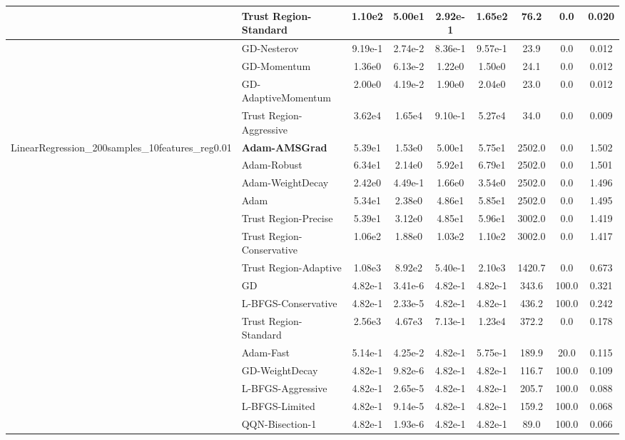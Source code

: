 \documentclass{article}
\begin{document}
\begin{longtable}{|l|l|c|c|c|c|c|c|c|}
\hline
 & Trust Region-Standard & 1.10e2 & 5.00e1 & 2.92e-1 & 1.65e2 & 76.2 & 0.0 & 0.020 \\
\hline
 & GD-Nesterov & 9.19e-1 & 2.74e-2 & 8.36e-1 & 9.57e-1 & 23.9 & 0.0 & 0.012 \\
\hline
 & GD-Momentum & 1.36e0 & 6.13e-2 & 1.22e0 & 1.50e0 & 24.1 & 0.0 & 0.012 \\
\hline
 & GD-AdaptiveMomentum & 2.00e0 & 4.19e-2 & 1.90e0 & 2.04e0 & 23.0 & 0.0 & 0.012 \\
\hline
 & Trust Region-Aggressive & 3.62e4 & 1.65e4 & 9.10e-1 & 5.27e4 & 34.0 & 0.0 & 0.009 \\
LinearRegression\_200samples\_10features\_reg0.01 & \textbf{Adam-AMSGrad} & 5.39e1 & 1.53e0 & 5.00e1 & 5.75e1 & 2502.0 & 0.0 & 1.502 \\
\hline
 & Adam-Robust & 6.34e1 & 2.14e0 & 5.92e1 & 6.79e1 & 2502.0 & 0.0 & 1.501 \\
\hline
 & Adam-WeightDecay & 2.42e0 & 4.49e-1 & 1.66e0 & 3.54e0 & 2502.0 & 0.0 & 1.496 \\
\hline
 & Adam & 5.34e1 & 2.38e0 & 4.86e1 & 5.85e1 & 2502.0 & 0.0 & 1.495 \\
\hline
 & Trust Region-Precise & 5.39e1 & 3.12e0 & 4.85e1 & 5.96e1 & 3002.0 & 0.0 & 1.419 \\
\hline
 & Trust Region-Conservative & 1.06e2 & 1.88e0 & 1.03e2 & 1.10e2 & 3002.0 & 0.0 & 1.417 \\
\hline
 & Trust Region-Adaptive & 1.08e3 & 8.92e2 & 5.40e-1 & 2.10e3 & 1420.7 & 0.0 & 0.673 \\
\hline
 & GD & 4.82e-1 & 3.41e-6 & 4.82e-1 & 4.82e-1 & 343.6 & 100.0 & 0.321 \\
\hline
 & L-BFGS-Conservative & 4.82e-1 & 2.33e-5 & 4.82e-1 & 4.82e-1 & 436.2 & 100.0 & 0.242 \\
\hline
 & Trust Region-Standard & 2.56e3 & 4.67e3 & 7.13e-1 & 1.23e4 & 372.2 & 0.0 & 0.178 \\
\hline
 & Adam-Fast & 5.14e-1 & 4.25e-2 & 4.82e-1 & 5.75e-1 & 189.9 & 20.0 & 0.115 \\
\hline
 & GD-WeightDecay & 4.82e-1 & 9.82e-6 & 4.82e-1 & 4.82e-1 & 116.7 & 100.0 & 0.109 \\
\hline
 & L-BFGS-Aggressive & 4.82e-1 & 2.65e-5 & 4.82e-1 & 4.82e-1 & 205.7 & 100.0 & 0.088 \\
\hline
 & L-BFGS-Limited & 4.82e-1 & 9.14e-5 & 4.82e-1 & 4.82e-1 & 159.2 & 100.0 & 0.068 \\
\hline
 & QQN-Bisection-1 & 4.82e-1 & 1.93e-6 & 4.82e-1 & 4.82e-1 & 89.0 & 100.0 & 0.066 \\

\end{longtable}
\end{document}
